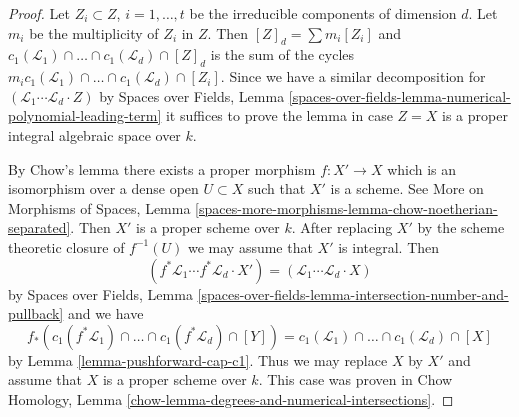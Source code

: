\begin{proof}
Let $Z_i \subset Z$, $i = 1, \ldots, t$ be the irreducible components
of dimension $d$. Let $m_i$ be the multiplicity of $Z_i$ in $Z$. Then
$[Z]_d = \sum m_i[Z_i]$ and
$c_1(\mathcal{L}_1) \cap \ldots \cap c_1(\mathcal{L}_d) \cap [Z]_d$
is the sum of the cycles
$m_i c_1(\mathcal{L}_1) \cap \ldots \cap c_1(\mathcal{L}_d) \cap [Z_i]$.
Since we have a similar decomposition for
$(\mathcal{L}_1 \cdots \mathcal{L}_d \cdot Z)$ by
Spaces over Fields, Lemma
\ref{spaces-over-fields-lemma-numerical-polynomial-leading-term}
it suffices to prove the lemma in case $Z = X$
is a proper integral algebraic space over $k$.

\medskip\noindent
By Chow's lemma there exists a proper morphism $f : X' \to X$
which is an isomorphism over a dense open $U \subset X$
such that $X'$ is a scheme. See More on Morphisms of Spaces, Lemma
\ref{spaces-more-morphisms-lemma-chow-noetherian-separated}.
Then $X'$ is a proper scheme over $k$. After replacing $X'$
by the scheme theoretic closure of $f^{-1}(U)$
we may assume that $X'$ is integral. Then
$$
(f^*\mathcal{L}_1 \cdots f^*\mathcal{L}_d \cdot X') =
(\mathcal{L}_1 \cdots \mathcal{L}_d \cdot X)
$$
by Spaces over Fields, Lemma
\ref{spaces-over-fields-lemma-intersection-number-and-pullback}
and we have
$$
f_*(c_1(f^*\mathcal{L}_1) \cap \ldots \cap c_1(f^*\mathcal{L}_d) \cap [Y]) =
c_1(\mathcal{L}_1) \cap \ldots \cap c_1(\mathcal{L}_d) \cap [X]
$$
by Lemma \ref{lemma-pushforward-cap-c1}. Thus we may replace $X$ by $X'$
and assume that $X$ is a proper scheme over $k$. This case
was proven in Chow Homology, Lemma
\ref{chow-lemma-degrees-and-numerical-intersections}.
\end{proof}





















